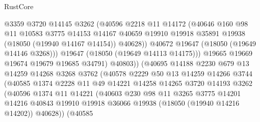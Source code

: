 \begin{lexlean}{RustCore}
\begin{coremodule}
                          @3359
                          @3720
                          @14145
                          @3262
                          (@40596
                            @2218
                            @11
                            @14172
                            (@40646
                              @160
                              @98
                              @11
                              @10583
                              @3775
                              @14153
                              @14167
                              @40659
                              @19910
                              @19918
                              @35891
                              @19938
                              (@18050 (@19940 @14167 @14154))
                              @40628))
                          @40672
                          @19647
                          (@18050 (@19649 @14146 @3268)))
                        @19647
                        (@18050 (@19649 @14113 @14175)))
                      @19665
                      @19669
                      @19674
                      @19679
                      @19685
                      @34791)
                    @40803))
                (@40695
                  @14188
                  @2230
                  @679
                  @13
                  @14259
                  @14268
                  @3268
                  @3762
                  (@40578
                    @2229
                    @50
                    @13
                    @14259
                    @14266
                    @3744
                    (@40585
                      @1374
                      @2228
                      @11
                      @49
                      @14221
                      @14258
                      @14265
                      @3720
                      @14193
                      @3262
                      (@40596
                        @1374
                        @11
                        @14221
                        (@40603
                          @230
                          @98
                          @11
                          @3265
                          @3775
                          @14201
                          @14216
                          @40843
                          @19910
                          @19918
                          @36066
                          @19938
                          (@18050 (@19940 @14216 @14202))
                          @40628))
                      (@40585

\end{coremodule}
\end{lexlean}
